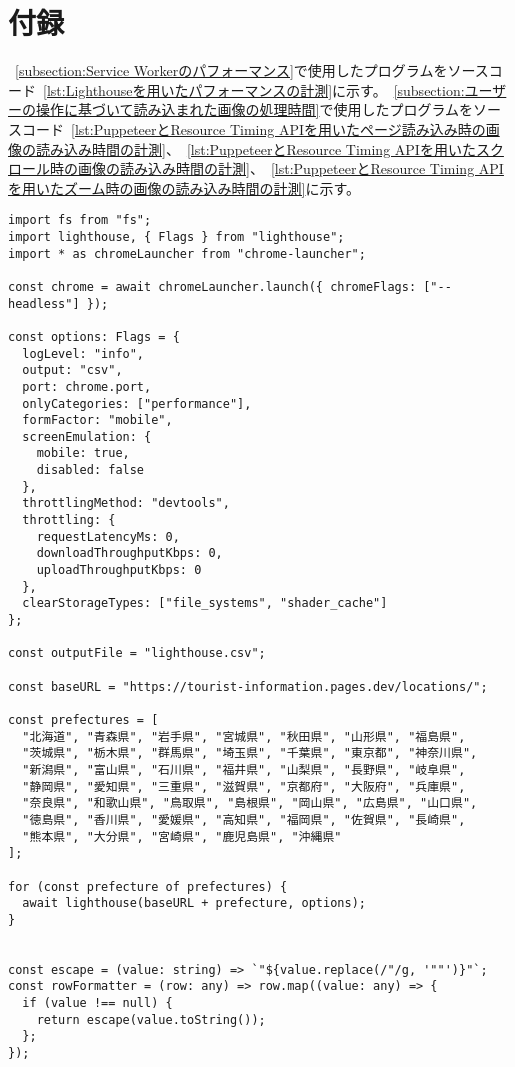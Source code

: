 \section*{付録}
~\autoref{subsection:Service Workerのパフォーマンス}で使用したプログラムをソースコード~\ref{lst:Lighthouseを用いたパフォーマンスの計測}に示す。~\autoref{subsection:ユーザーの操作に基づいて読み込まれた画像の処理時間}で使用したプログラムをソースコード~\ref{lst:PuppeteerとResource Timing APIを用いたページ読み込み時の画像の読み込み時間の計測}、~\ref{lst:PuppeteerとResource Timing APIを用いたスクロール時の画像の読み込み時間の計測}、~\ref{lst:PuppeteerとResource Timing APIを用いたズーム時の画像の読み込み時間の計測}に示す。

\begin{lstlisting}[caption={Lighthouseを用いたパフォーマンスの計測},label={lst:Lighthouseを用いたパフォーマンスの計測}]
import fs from "fs";
import lighthouse, { Flags } from "lighthouse";
import * as chromeLauncher from "chrome-launcher";

const chrome = await chromeLauncher.launch({ chromeFlags: ["--headless"] });

const options: Flags = {
  logLevel: "info",
  output: "csv",
  port: chrome.port,
  onlyCategories: ["performance"],
  formFactor: "mobile",
  screenEmulation: {
    mobile: true,
    disabled: false
  },
  throttlingMethod: "devtools",
  throttling: {
    requestLatencyMs: 0,
    downloadThroughputKbps: 0,
    uploadThroughputKbps: 0
  },
  clearStorageTypes: ["file_systems", "shader_cache"]
};

const outputFile = "lighthouse.csv";

const baseURL = "https://tourist-information.pages.dev/locations/";

const prefectures = [
  "北海道", "青森県", "岩手県", "宮城県", "秋田県", "山形県", "福島県",
  "茨城県", "栃木県", "群馬県", "埼玉県", "千葉県", "東京都", "神奈川県",
  "新潟県", "富山県", "石川県", "福井県", "山梨県", "長野県", "岐阜県",
  "静岡県", "愛知県", "三重県", "滋賀県", "京都府", "大阪府", "兵庫県",
  "奈良県", "和歌山県", "鳥取県", "島根県", "岡山県", "広島県", "山口県",
  "徳島県", "香川県", "愛媛県", "高知県", "福岡県", "佐賀県", "長崎県",
  "熊本県", "大分県", "宮崎県", "鹿児島県", "沖縄県"
];

for (const prefecture of prefectures) {
  await lighthouse(baseURL + prefecture, options);
}


const escape = (value: string) => `"${value.replace(/"/g, '""')}"`;
const rowFormatter = (row: any) => row.map((value: any) => {
  if (value !== null) {
    return escape(value.toString());
  };
});


\end{lstlisting}
